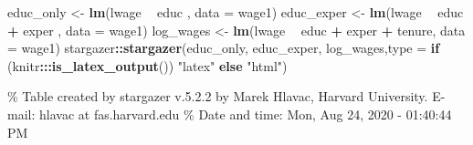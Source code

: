 \documentclass[]{book}
\newenvironment{Shaded}{\begin{snugshade}}{\end{snugshade}}
\newcommand{\KeywordTok}[1]{\textcolor[rgb]{0.13,0.29,0.53}{\textbf{#1}}}
\newcommand{\DataTypeTok}[1]{\textcolor[rgb]{0.13,0.29,0.53}{#1}}
\newcommand{\StringTok}[1]{\textcolor[rgb]{0.31,0.60,0.02}{#1}}
\newcommand{\ControlFlowTok}[1]{\textcolor[rgb]{0.13,0.29,0.53}{\textbf{#1}}}
\newcommand{\OperatorTok}[1]{\textcolor[rgb]{0.81,0.36,0.00}{\textbf{#1}}}
\newcommand{\NormalTok}[1]{#1}
\begin{document}
\begin{Shaded}
\begin{Highlighting}[]
\NormalTok{educ_only <-}\StringTok{ }\KeywordTok{lm}\NormalTok{(lwage }\OperatorTok{~}\StringTok{ }\NormalTok{educ                 , }\DataTypeTok{data =}\NormalTok{ wage1)}
\NormalTok{educ_exper <-}\StringTok{ }\KeywordTok{lm}\NormalTok{(lwage }\OperatorTok{~}\StringTok{ }\NormalTok{educ }\OperatorTok{+}\StringTok{ }\NormalTok{exper        , }\DataTypeTok{data =}\NormalTok{ wage1)}
\NormalTok{log_wages <-}\StringTok{ }\KeywordTok{lm}\NormalTok{(lwage }\OperatorTok{~}\StringTok{ }\NormalTok{educ }\OperatorTok{+}\StringTok{ }\NormalTok{exper }\OperatorTok{+}\StringTok{ }\NormalTok{tenure, }\DataTypeTok{data =}\NormalTok{ wage1)}
\NormalTok{stargazer}\OperatorTok{::}\KeywordTok{stargazer}\NormalTok{(educ_only, educ_exper, log_wages,}\DataTypeTok{type =} \ControlFlowTok{if}\NormalTok{ (knitr}\OperatorTok{:::}\KeywordTok{is_latex_output}\NormalTok{()) }\StringTok{"latex"} \ControlFlowTok{else} \StringTok{"html"}\NormalTok{)}
\end{Highlighting}
\end{Shaded}

\% Table created by stargazer v.5.2.2 by Marek Hlavac, Harvard
University. E-mail: hlavac at fas.harvard.edu \% Date and time: Mon, Aug
24, 2020 - 01:40:44 PM
\end{document}
